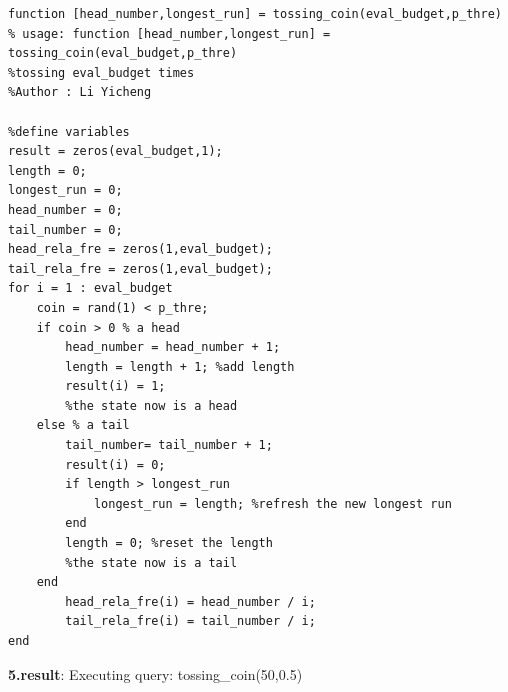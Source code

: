 \documentclass[twoside]{article}
\begin{document}
\begin{lstlisting}
function [head_number,longest_run] = tossing_coin(eval_budget,p_thre)
% usage: function [head_number,longest_run] = tossing_coin(eval_budget,p_thre)
%tossing eval_budget times
%Author : Li Yicheng 

%define variables
result = zeros(eval_budget,1);
length = 0;
longest_run = 0;
head_number = 0;
tail_number = 0;
head_rela_fre = zeros(1,eval_budget);
tail_rela_fre = zeros(1,eval_budget);
for i = 1 : eval_budget
    coin = rand(1) < p_thre;
    if coin > 0 % a head
        head_number = head_number + 1;
        length = length + 1; %add length
        result(i) = 1;
        %the state now is a head
    else % a tail
        tail_number= tail_number + 1;
        result(i) = 0;
        if length > longest_run
            longest_run = length; %refresh the new longest run
        end
        length = 0; %reset the length
        %the state now is a tail
    end
        head_rela_fre(i) = head_number / i;
        tail_rela_fre(i) = tail_number / i;
end
\end{lstlisting}
\textbf{5.result}: Executing query: tossing\_coin(50,0.5)
\end{document}
